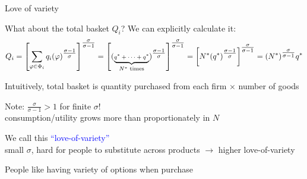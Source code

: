 \documentclass[notes,11pt, aspectratio=169, xcolor=table]{beamer}
\newcommand{\blue}[1]{\textcolor{blue}{#1}}
\newenvironment{wideitemize}{\itemize\addtolength{\itemsep}{10pt}}{\enditemize}
\begin{document}
\begin{frame}{Love of variety}

\begin{wideitemize}
    \item What about the total basket $Q_i$? We can explicitly calculate it:
\begin{equation*}
        {\scriptsize 
        Q_i = \left[ \sum_{\varphi \in \Phi_i } q_i(
    \varphi)^{\tfrac{\sigma-1}{\sigma}} \right]^{\tfrac{\sigma}{\sigma-1} }  = \left[ ( \underbrace{q^*+ \cdots + q^*}_{N^*\text{ times}}
    )^{\tfrac{\sigma-1}{\sigma}} \right]^{\tfrac{\sigma}{\sigma-1} } = \left[ N^* ( q^*
    )^{\tfrac{\sigma-1}{\sigma}} \right]^{\tfrac{\sigma}{\sigma-1} } = (N^*)^{\tfrac{\sigma}{\sigma-1} } q^* }
    \end{equation*}

    \item<2-> Intuitively, total basket is quantity purchased from each firm $\times$ number of goods

    \item<3-> Note: $\tfrac{\sigma}{\sigma-1}>1$ for finite $\sigma$! \\ \qquad consumption/utility grows more than proportionately in $N$

    \item<4-> We call this \blue{``love-of-variety''} \\
    \qquad small $\sigma$, hard for people to substitute across products $\rightarrow$ higher love-of-variety

    \item<5-> People like having variety of options when purchase

\end{wideitemize}

\end{frame}
\end{document}
